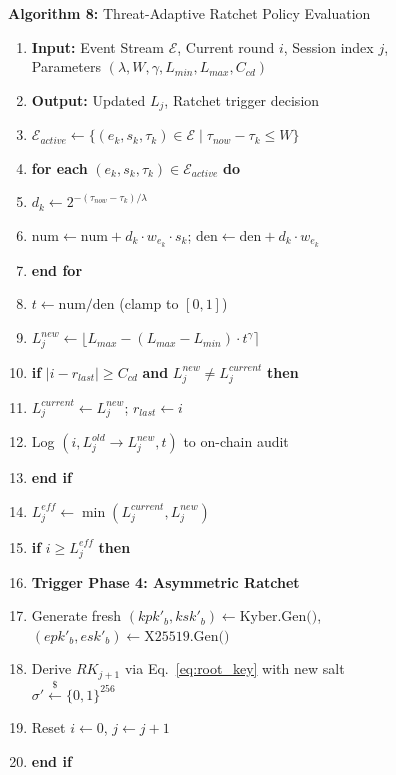 \documentclass[journal, 10pt, twocolumn]{IEEEtran}
\begin{document}
\begin{figure}[!t]
\hrulefill
\vspace{-0.2cm}
\begin{center}
\textbf{Algorithm 8:} Threat-Adaptive Ratchet Policy Evaluation
\end{center}
\vspace{-0.2cm}
\hrulefill
\begin{enumerate}
    \item \textbf{Input:} Event Stream $\mathcal{E}$, Current round $i$, Session index $j$, Parameters $(\lambda, W, \gamma, L_{min}, L_{max}, C_{cd})$
    \item \textbf{Output:} Updated $L_j$, Ratchet trigger decision
    \item $\mathcal{E}_{active} \leftarrow \{(e_k, s_k, \tau_k) \in \mathcal{E} \mid \tau_{now} - \tau_k \leq W\}$
    \item \textbf{for each} $(e_k, s_k, \tau_k) \in \mathcal{E}_{active}$ \textbf{do}
    \item \quad $d_k \leftarrow 2^{-(\tau_{now} - \tau_k)/\lambda}$
    \item \quad $\text{num} \leftarrow \text{num} + d_k \cdot w_{e_k} \cdot s_k$; \quad $\text{den} \leftarrow \text{den} + d_k \cdot w_{e_k}$
    \item \textbf{end for}
    \item $t \leftarrow \text{num} / \text{den}$ \quad (clamp to $[0, 1]$)
    \item $L_j^{new} \leftarrow \lfloor L_{max} - (L_{max} - L_{min}) \cdot t^{\gamma} \rceil$
    \item \textbf{if} $|i - r_{last}| \geq C_{cd}$ \textbf{and} $L_j^{new} \neq L_j^{current}$ \textbf{then}
    \item \quad $L_j^{current} \leftarrow L_j^{new}$; \quad $r_{last} \leftarrow i$
    \item \quad Log $(i, L_j^{old} \to L_j^{new}, t)$ to on-chain audit
    \item \textbf{end if}
    \item $L_j^{eff} \leftarrow \min(L_j^{current}, L_j^{new})$
    \item \textbf{if} $i \geq L_j^{eff}$ \textbf{then}
    \item \quad \textbf{Trigger Phase 4: Asymmetric Ratchet}
    \item \quad Generate fresh $(kpk'_b, ksk'_b) \leftarrow \text{Kyber.Gen()}$, $(epk'_b, esk'_b) \leftarrow \text{X25519.Gen()}$
    \item \quad Derive $RK_{j+1}$ via Eq.~\eqref{eq:root_key} with new salt $\sigma' \xleftarrow{\$} \{0,1\}^{256}$
    \item \quad Reset $i \leftarrow 0$, $j \leftarrow j+1$
    \item \textbf{end if}
\end{enumerate}
\hrulefill
\end{figure}
\end{document}
